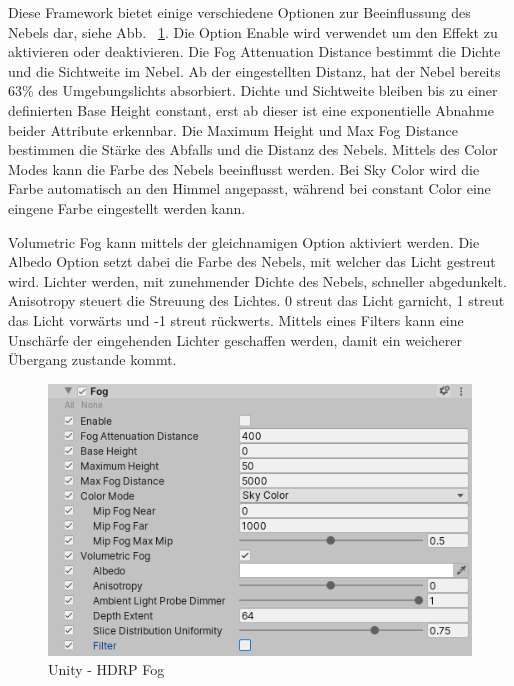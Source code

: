 Diese Framework bietet einige verschiedene Optionen zur Beeinflussung des Nebels dar, siehe Abb. ~\ref{fig:unity-hdrp-fog}.
Die Option Enable wird verwendet um den Effekt zu aktivieren oder deaktivieren.
Die Fog Attenuation Distance bestimmt die Dichte und die Sichtweite im Nebel.
Ab der eingestellten Distanz, hat der Nebel bereits 63\% des Umgebungslichts absorbiert.
Dichte und Sichtweite bleiben bis zu einer definierten Base Height constant, erst ab dieser ist eine exponentielle Abnahme beider Attribute erkennbar.
Die Maximum Height und Max Fog Distance bestimmen die Stärke des Abfalls und die Distanz des Nebels.
Mittels des Color Modes kann die Farbe des Nebels beeinflusst werden.
Bei Sky Color wird die Farbe automatisch an den Himmel angepasst, während bei constant Color eine eingene Farbe eingestellt werden kann.

Volumetric Fog kann mittels der gleichnamigen Option aktiviert werden.
Die Albedo Option setzt dabei die Farbe des Nebels, mit welcher das Licht gestreut wird.
Lichter werden, mit zunehmender Dichte des Nebels, schneller abgedunkelt.
Anisotropy steuert die Streuung des Lichtes.
0 streut das Licht garnicht, 1 streut das Licht vorwärts und -1 streut rückwerts.
Mittels eines Filters kann eine Unschärfe der eingehenden Lichter geschaffen werden, damit ein weicherer Übergang zustande kommt.
~\cite{Unity_HDRP_Fog_2022}

\begin {figure}
    \centering
    \includegraphics[scale=0.9]{pics/unity-hdrp-fog}
    \caption{Unity - HDRP Fog}
    \label{fig:unity-hdrp-fog}
\end {figure}


